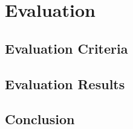\chapter{Evaluation}
\blindtext%

\section{Evaluation Criteria}
\blindtext%

\section{Evaluation Results}
\blindtext%

\section{Conclusion}
\blindtext%
